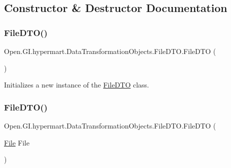 \subsection{Constructor \& Destructor Documentation}
\hypertarget{class_open_1_1_g_i_1_1hypermart_1_1_data_transformation_objects_1_1_file_d_t_o_ae0da87388dbf076d2aa151cce63c81a8}{}\label{class_open_1_1_g_i_1_1hypermart_1_1_data_transformation_objects_1_1_file_d_t_o_ae0da87388dbf076d2aa151cce63c81a8} 
\subsubsection{\texorpdfstring{File\+D\+T\+O()}{FileDTO()}\hspace{0.1cm}{\footnotesize\ttfamily [1/2]}}
{\footnotesize\ttfamily Open.\+G\+I.\+hypermart.\+Data\+Transformation\+Objects.\+File\+D\+T\+O.\+File\+D\+TO (\begin{DoxyParamCaption}{ }\end{DoxyParamCaption})}



Initializes a new instance of the \hyperlink{class_open_1_1_g_i_1_1hypermart_1_1_data_transformation_objects_1_1_file_d_t_o}{File\+D\+TO} class. 

\hypertarget{class_open_1_1_g_i_1_1hypermart_1_1_data_transformation_objects_1_1_file_d_t_o_add1a3ae47dca46ed24d3d8dda310a3a2}{}\label{class_open_1_1_g_i_1_1hypermart_1_1_data_transformation_objects_1_1_file_d_t_o_add1a3ae47dca46ed24d3d8dda310a3a2} 
\subsubsection{\texorpdfstring{File\+D\+T\+O()}{FileDTO()}\hspace{0.1cm}{\footnotesize\ttfamily [2/2]}}
{\footnotesize\ttfamily Open.\+G\+I.\+hypermart.\+Data\+Transformation\+Objects.\+File\+D\+T\+O.\+File\+D\+TO (\begin{DoxyParamCaption}\item[{\hyperlink{class_open_1_1_g_i_1_1hypermart_1_1_models_1_1_file}{File}}]{File }\end{DoxyParamCaption})}



